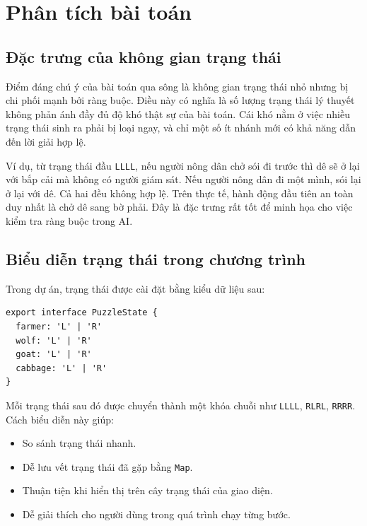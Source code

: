\documentclass[a4paper,12pt]{article}
\begin{document}
\section{Phân tích bài toán}

\subsection{Đặc trưng của không gian trạng thái}

Điểm đáng chú ý của bài toán qua sông là không gian trạng thái nhỏ nhưng bị chi phối mạnh bởi ràng buộc. Điều này có nghĩa là số lượng trạng thái lý thuyết không phản ánh đầy đủ độ khó thật sự của bài toán. Cái khó nằm ở việc nhiều trạng thái sinh ra phải bị loại ngay, và chỉ một số ít nhánh mới có khả năng dẫn đến lời giải hợp lệ.

Ví dụ, từ trạng thái đầu \texttt{LLLL}, nếu người nông dân chở sói đi trước thì dê sẽ ở lại với bắp cải mà không có người giám sát. Nếu người nông dân đi một mình, sói lại ở lại với dê. Cả hai đều không hợp lệ. Trên thực tế, hành động đầu tiên an toàn duy nhất là chở dê sang bờ phải. Đây là đặc trưng rất tốt để minh họa cho việc kiểm tra ràng buộc trong AI.

\subsection{Biểu diễn trạng thái trong chương trình}

Trong dự án, trạng thái được cài đặt bằng kiểu dữ liệu sau:

\begin{lstlisting}[caption={Khai báo trạng thái trong TypeScript}]
export interface PuzzleState {
  farmer: 'L' | 'R'
  wolf: 'L' | 'R'
  goat: 'L' | 'R'
  cabbage: 'L' | 'R'
}
\end{lstlisting}

Mỗi trạng thái sau đó được chuyển thành một khóa chuỗi như \texttt{LLLL}, \texttt{RLRL}, \texttt{RRRR}. Cách biểu diễn này giúp:
\begin{itemize}
    \item So sánh trạng thái nhanh.
    \item Dễ lưu vết trạng thái đã gặp bằng \texttt{Map}.
    \item Thuận tiện khi hiển thị trên cây trạng thái của giao diện.
    \item Dễ giải thích cho người dùng trong quá trình chạy từng bước.
\end{itemize}
\end{document}
